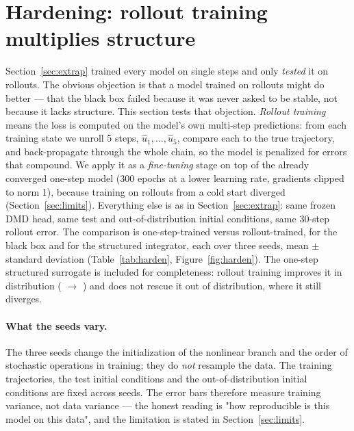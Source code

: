 \documentclass[11pt,a4paper]{article}
\begin{document}
\section{Hardening: rollout training multiplies structure}\label{sec:harden}
Section~\ref{sec:extrap} trained every model on single steps and only \emph{tested} it on rollouts. The obvious objection is that a model trained on rollouts might do better — that the black box failed because it was never asked to be stable, not because it lacks structure. This section tests that objection. \emph{Rollout training} means the loss is computed on the model's own multi-step predictions: from each training state we unroll 5 steps, $\hat u_1, \dots, \hat u_5$, compare each to the true trajectory, and back-propagate through the whole chain, so the model is penalized for errors that compound. We apply it as a \emph{fine-tuning} stage on top of the already converged one-step model (300 epochs at a lower learning rate, gradients clipped to norm 1), because training on rollouts from a cold start diverged (Section~\ref{sec:limits}). Everything else is as in Section~\ref{sec:extrap}: same frozen DMD head, same test and out-of-distribution initial conditions, same 30-step rollout error. The comparison is one-step-trained versus rollout-trained, for the black box and for the structured integrator, each over three seeds, mean $\pm$ standard deviation (Table~\ref{tab:harden}, Figure~\ref{fig:harden}). The one-step structured surrogate is included for completeness: rollout training improves it in distribution (\wpHardQuadStepOneId{} $\to$ \wpHardQuadStepRollId) and does not rescue it out of distribution, where it still diverges.

\paragraph{What the seeds vary.} The three seeds change the initialization of the nonlinear branch and the order of stochastic operations in training; they do \emph{not} resample the data. The training trajectories, the test initial conditions and the out-of-distribution initial conditions are fixed across seeds. The error bars therefore measure training variance, not data variance — the honest reading is "how reproducible is this model on this data", and the limitation is stated in Section~\ref{sec:limits}.
\end{document}
